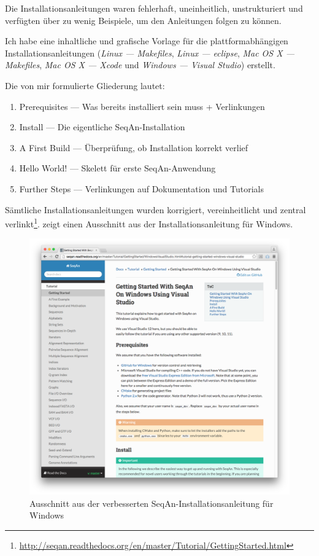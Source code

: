Die Installationsanleitungen waren fehlerhaft, uneinheitlich, unstrukturiert und verfügten über zu wenig Beispiele, um den Anleitungen folgen zu können.

Ich habe eine inhaltliche und grafische Vorlage für die plattformabhängigen Installationsanleitungen (\textit{Linux --- Makefiles}, \textit{Linux --- \gls{eclipse}}, \textit{Mac OS X --- Makefiles}, \textit{Mac OS X --- Xcode} und \textit{Windows --- Visual Studio}) erstellt.

Die von mir formulierte Gliederung lautet:
\begin{enumerate}
\itemsep1pt\parskip0pt
  \item Prerequisites --- Was bereits installiert sein muss + Verlinkungen
  \item Install --- Die eigentliche SeqAn-Installation
  \item A First Build --- Überprüfung, ob Installation korrekt verlief
  \item Hello World! --- Skelett für erste SeqAn-Anwendung
  \item Further Steps --- Verlinkungen auf Dokumentation und Tutorials
\end{enumerate}

Sämtliche Installationsanleitungen wurden korrigiert, vereinheitlicht und zentral verlinkt\footnote{\url{http://seqan.readthedocs.org/en/master/Tutorial/GettingStarted.html}}.  zeigt einen Ausschnitt aus der Installationsanleitung für Windows.

\begin{figure}
  \centering
    \includegraphics[width=1.0\linewidth]{Figures/getting-started-windows.png}
  \caption[SeqAn-Installation unter Windows]{Ausschnitt aus der verbesserten SeqAn-Installationsanleitung für Windows}
  \label{fig:getting-started-windows}
\end{figure}



